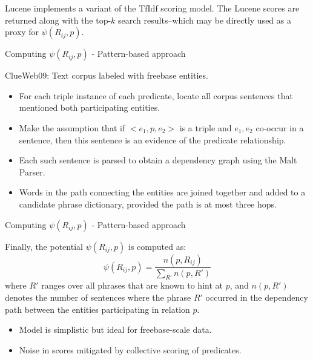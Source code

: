 \documentclass[pdf,11pt]{beamer}
\begin{document}
\begin{frame}
Lucene implements a variant of the TfIdf scoring model. The Lucene scores are returned along with the top-$k$ search results--which may be directly used as a proxy for $\psi(R_{ij}, p)$.
\end{frame}

\begin{frame}{Computing $\psi(R_{ij},p)$ - Pattern-based approach}
\begin{block}{}
ClueWeb09: Text corpus labeled with freebase entities.
\end{block}

\begin{itemize}
\item For each triple instance of each predicate, locate all corpus sentences that mentioned both participating entities.
\item Make the assumption that if $<e_1, p, e_2>$ is a triple and $e_1, e_2$ co-occur in a sentence, then this sentence is an evidence of the predicate relationship.
\item Each such sentence is parsed to obtain a dependency graph using the Malt Parser.
\item Words in the path connecting the entities are joined together and added to a candidate phrase dictionary, provided the path is at most three hops.
\end{itemize}

\end{frame}

\begin{frame}{Computing $\psi(R_{ij},p)$ - Pattern-based approach}

Finally, the potential $\psi(R_{ij}, p)$ is computed as:
$$\psi(R_{ij},p) = \frac{n(p, R_{ij})}{\sum_{R'}{n(p, R')}}$$
where $R'$ ranges over all phrases that are known to
hint at $p$, and $n(p, R')$ denotes the number of sentences
where the phrase $R'$ occurred in the dependency
path between the entities participating in relation
$p$.

\begin{itemize}
\item Model is simplistic but ideal for freebase-scale data.
\item Noise in scores mitigated by collective scoring of predicates.
\end{itemize}
\end{frame}

\end{document}
